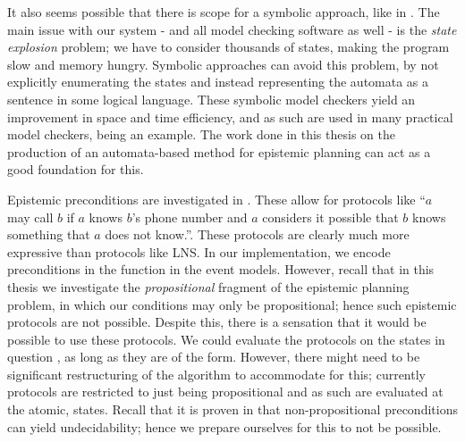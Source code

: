 \documentclass[10pt, a4paper]{report}
\begin{document}
It also seems possible that there is scope for a symbolic approach, like in
\cite{MalvinThesis}. The main issue with our system - and all model checking
software as well - is the \emph{state explosion} problem; we have to consider
thousands of states, making the program slow and memory hungry. Symbolic
approaches can avoid this problem, by not explicitly enumerating the states and
instead representing the automata as a sentence in some logical language. These
symbolic model checkers yield an improvement in space and time efficiency, and
as such are used in many practical model checkers, \cite{SMCDEL} being an
example. The work done in this thesis on the production of an automata-based
method for epistemic planning can act as a good foundation for this.


Epistemic preconditions are investigated in \cite{EpProforDyGo}. These allow for
protocols like ``$a$ may call $b$ if $a$ knows $b$'s phone number and $a$
considers it possible that $b$ knows something that $a$ does not know.''. These
protocols are clearly much more expressive than protocols like \textsf{LNS}. In
our implementation, we encode preconditions in the \tpre function in the event
models. However, recall that in this thesis we investigate the
\emph{propositional} fragment of the epistemic planning problem, in which our
\tpre conditions may only be propositional; hence such epistemic protocols are
not possible. Despite this, there is a sensation that it would be possible to
use these protocols. We could evaluate the protocols on the states in question ,
as long as they are of the  form. However, there might need to be
significant restructuring of the algorithm to accommodate for this; currently
protocols are restricted to just being propositional and as such are evaluated
at the atomic,  states. Recall that it is proven in
\cite{UndecidabilityEP} that non-propositional preconditions can yield
undecidability; hence we prepare ourselves for this to not be possible.


\newpage

\printbibliography[title={Bibliography}]
\end{document}
